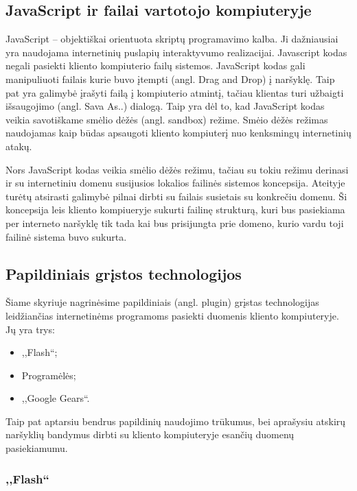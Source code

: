 \documentclass[12pt,a4paper,titlepage]{article}
\begin{document}
\subsection{JavaScript ir failai vartotojo kompiuteryje}

JavaScript – objektiškai orientuota skriptų programavimo kalba. Ji dažniausiai yra naudojama internetinių puslapių interaktyvumo realizacijai. Javascript kodas negali pasiekti kliento kompiuterio failų sistemos. JavaScript kodas gali manipuliuoti failais kurie buvo įtempti (angl. Drag and Drop) į naršyklę. Taip pat yra galimybė įrašyti failą į kompiuterio atmintį, tačiau klientas turi užbaigti išsaugojimo (angl. Sava As..) dialogą. Taip yra dėl to, kad JavaScript kodas veikia savotiškame smėlio dėžės (angl. sandbox) režime. Smėio dėžės režimas naudojamas kaip būdas apsaugoti kliento kompiuterį nuo kenksmingų internetinių atakų.

Nors JavaScript kodas veikia smėlio dėžės režimu, tačiau su tokiu režimu derinasi ir su internetiniu domenu susijusios lokalios failinės sistemos koncepsija\cite{FIA10}. Ateityje turėtų atsirasti galimybė pilnai dirbti su failais susietais su konkrečiu domenu. Ši koncepsija leis kliento kompiueryje sukurti failinę strukturą, kuri bus pasiekiama per interneto naršyklę tik tada kai bus prisijungta prie domeno, kurio vardu toji failinė sistema buvo sukurta.

\subsection{Papildiniais grįstos technologijos}

Šiame skyriuje nagrinėsime papildiniais (angl. plugin) grįstas technologijas leidžiančias internetinėms programoms pasiekti duomenis kliento kompiuteryje. Jų yra trys:
\begin{itemize}
  \item ,,Flash``;
  \item Programėlės;
  \item ,,Google Gears``.
\end{itemize}

Taip pat aptarsiu bendrus papildinių naudojimo trūkumus, bei aprašysiu atskirų naršyklių bandymus dirbti su kliento kompiuteryje esančių duomenų pasiekiamumu.

\subsubsection{,,Flash``}
\end{document}
